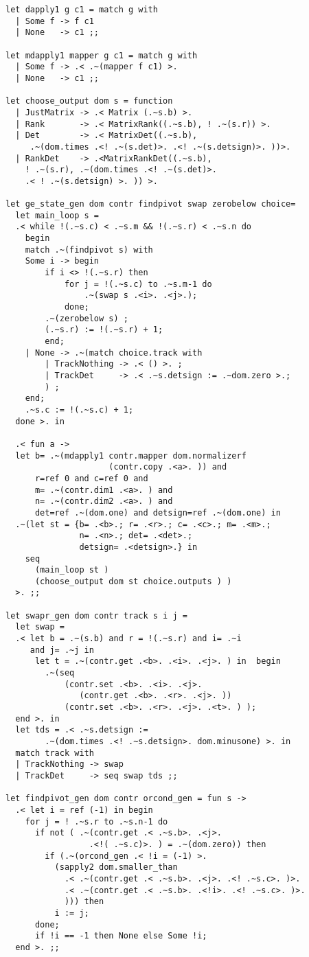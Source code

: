 \documentclass[11pt]{elsart}
\begin{document}
\begin{small}
\begin{verbatim}
let dapply1 g c1 = match g with
  | Some f -> f c1
  | None   -> c1 ;;

let mdapply1 mapper g c1 = match g with
  | Some f -> .< .~(mapper f c1) >.
  | None   -> c1 ;;

let choose_output dom s = function
  | JustMatrix -> .< Matrix (.~s.b) >.
  | Rank       -> .< MatrixRank((.~s.b), ! .~(s.r)) >.
  | Det        -> .< MatrixDet((.~s.b), 
     .~(dom.times .<! .~(s.det)>. .<! .~(s.detsign)>. ))>.
  | RankDet    -> .<MatrixRankDet((.~s.b), 
    ! .~(s.r), .~(dom.times .<! .~(s.det)>.
    .< ! .~(s.detsign) >. )) >.

let ge_state_gen dom contr findpivot swap zerobelow choice=
  let main_loop s = 
  .< while !(.~s.c) < .~s.m && !(.~s.r) < .~s.n do
    begin
    match .~(findpivot s) with
    Some i -> begin
        if i <> !(.~s.r) then
            for j = !(.~s.c) to .~s.m-1 do
                .~(swap s .<i>. .<j>.);
            done;
        .~(zerobelow s) ;
        (.~s.r) := !(.~s.r) + 1;
        end;
    | None -> .~(match choice.track with
        | TrackNothing -> .< () >. ;
        | TrackDet     -> .< .~s.detsign := .~dom.zero >.;
        ) ;
    end;
    .~s.c := !(.~s.c) + 1;
  done >. in

  .< fun a -> 
  let b= .~(mdapply1 contr.mapper dom.normalizerf 
                     (contr.copy .<a>. )) and
      r=ref 0 and c=ref 0 and
      m= .~(contr.dim1 .<a>. ) and 
      n= .~(contr.dim2 .<a>. ) and
      det=ref .~(dom.one) and detsign=ref .~(dom.one) in
  .~(let st = {b= .<b>.; r= .<r>.; c= .<c>.; m= .<m>.; 
               n= .<n>.; det= .<det>.; 
               detsign= .<detsign>.} in
    seq
      (main_loop st )
      (choose_output dom st choice.outputs ) ) 
  >. ;;

let swapr_gen dom contr track s i j =
  let swap =
  .< let b = .~(s.b) and r = !(.~s.r) and i= .~i 
     and j= .~j in
      let t = .~(contr.get .<b>. .<i>. .<j>. ) in  begin
        .~(seq
            (contr.set .<b>. .<i>. .<j>. 
               (contr.get .<b>. .<r>. .<j>. ))
            (contr.set .<b>. .<r>. .<j>. .<t>. ) );
  end >. in
  let tds = .< .~s.detsign := 
        .~(dom.times .<! .~s.detsign>. dom.minusone) >. in
  match track with
  | TrackNothing -> swap
  | TrackDet     -> seq swap tds ;;

let findpivot_gen dom contr orcond_gen = fun s ->
  .< let i = ref (-1) in begin 
    for j = ! .~s.r to .~s.n-1 do
      if not ( .~(contr.get .< .~s.b>. .<j>. 
                 .<!( .~s.c)>. ) = .~(dom.zero)) then 
        if (.~(orcond_gen .< !i = (-1) >.
          (sapply2 dom.smaller_than 
            .< .~(contr.get .< .~s.b>. .<j>. .<! .~s.c>. )>.
            .< .~(contr.get .< .~s.b>. .<!i>. .<! .~s.c>. )>.
            ))) then
          i := j;
      done;
      if !i == -1 then None else Some !i;
  end >. ;;


\end{verbatim}
\end{small}
\end{document}
